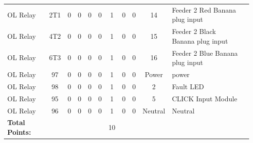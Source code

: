 \begin{table}[!htp]
{\begin{tabular}{lcccccccccll}
			OL Relay                   & 2T1                     & 0                                           & 0                                          & 0           & 0           & 1            & 0                & 0 & 14                           & Feeder 2 Red Banana plug input   &                \\
			OL Relay                   & 4T2                     & 0                                           & 0                                          & 0           & 0           & 1            & 0                & 0 & 15                           & Feeder 2 Black Banana plug input &                \\
			OL Relay                   & 6T3                     & 0                                           & 0                                          & 0           & 0           & 1            & 0                & 0 & 16                           & Feeder 2 Blue Banana plug input  &                \\
			OL Relay                   & 97                      & 0                                           & 0                                          & 0           & 0           & 1            & 0                & 0 & Power                        & power                            &                \\
			OL Relay                   & 98                      & 0                                           & 0                                          & 0           & 0           & 1            & 0                & 0 & 2                            & Fault LED                        &                \\
			OL Relay                   & 95                      & 0                                           & 0                                          & 0           & 0           & 1            & 0                & 0 & 5                            & CLICK Input Module               &                \\
			OL Relay                   & 96                      & 0                                           & 0                                          & 0           & 0           & 1            & 0                & 0 & Neutral                      & Neutral                          &                \\ \midrule
			\textbf{Total Points:}     &                         &                                             &                                            &             &             & 10           &                  &   &                              &                                  &                \\ \bottomrule
		\end{tabular}
	}
\end{table}
